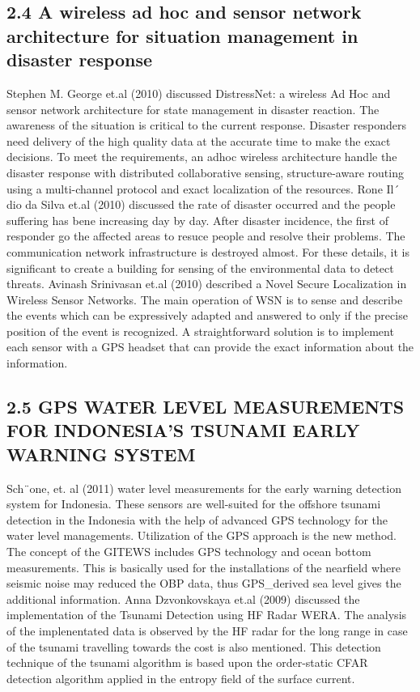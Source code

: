 \subsection{2.4 A wireless ad hoc and sensor network architecture for situation management in disaster response}
Stephen M. George et.al (2010) discussed DistressNet: a wireless Ad Hoc and sensor network architecture for state management in disaster reaction. The awareness of the situation is critical to the current response. Disaster responders need  delivery of the high quality data at the accurate time to make the exact decisions. To meet the requirements, an adhoc wireless architecture  handle the disaster response with distributed collaborative sensing, structure-aware routing using a multi-channel protocol and exact localization of the resources.
Rone Il´ dio da Silva et.al (2010)  discussed the rate of disaster occurred and the people suffering has bene increasing day by day. After disaster incidence, the first of responder go the affected areas  to resuce people and resolve their problems. The communication network infrastructure is destroyed almost. For these details, it is significant to create a building for sensing of the environmental data to detect threats.
Avinash Srinivasan et.al (2010) described a Novel Secure Localization in Wireless Sensor Networks. The main operation of WSN is to sense and describe the  events which can be expressively adapted and answered to only if the precise position of the event is recognized. A straightforward solution is to implement  each sensor with a GPS headset that can provide the exact information about the information.
\subsection{2.5 GPS WATER LEVEL MEASUREMENTS FOR INDONESIA’S TSUNAMI EARLY WARNING SYSTEM}
Sch¨one, et. al (2011)  water level measurements for the early warning detection system for Indonesia. These sensors are well-suited for the offshore tsunami detection in the Indonesia with the help of advanced GPS technology for the water level managements. Utilization of the GPS approach is the new method. The concept of the GITEWS  includes GPS technology and ocean bottom measurements. This is basically used for the installations of the nearfield where seismic noise may reduced the OBP data, thus GPS_derived sea level gives the additional information.
Anna Dzvonkovskaya et.al (2009)  discussed the implementation of the Tsunami Detection using HF Radar WERA. The analysis of the implenentated data is observed by the HF radar for the long range in case of the tsunami travelling towards the cost is also mentioned.  This detection technique of the tsunami algorithm is based upon the order-static CFAR detection algorithm applied in the entropy field of the surface current. 
